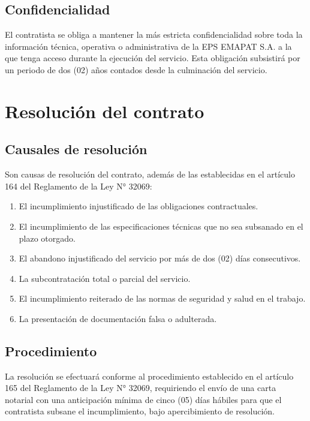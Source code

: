 \documentclass[12pt,a4paper]{article}
\begin{document}
\subsection{Confidencialidad}

El contratista se obliga a mantener la más estricta confidencialidad sobre toda la información técnica, operativa o administrativa de la EPS EMAPAT S.A. a la que tenga acceso durante la ejecución del servicio. Esta obligación subsistirá por un periodo de dos (02) años contados desde la culminación del servicio.

\section{Resolución del contrato}

\subsection{Causales de resolución}

Son causas de resolución del contrato, además de las establecidas en el artículo 164 del Reglamento de la Ley N° 32069:

\begin{enumerate}
  \item El incumplimiento injustificado de las obligaciones contractuales.
  \item El incumplimiento de las especificaciones técnicas que no sea subsanado en el plazo otorgado.
  \item El abandono injustificado del servicio por más de dos (02) días consecutivos.
  \item La subcontratación total o parcial del servicio.
  \item El incumplimiento reiterado de las normas de seguridad y salud en el trabajo.
  \item La presentación de documentación falsa o adulterada.
\end{enumerate}

\subsection{Procedimiento}

La resolución se efectuará conforme al procedimiento establecido en el artículo 165 del Reglamento de la Ley N° 32069, requiriendo el envío de una carta notarial con una anticipación mínima de cinco (05) días hábiles para que el contratista subsane el incumplimiento, bajo apercibimiento de resolución.
\end{document}
